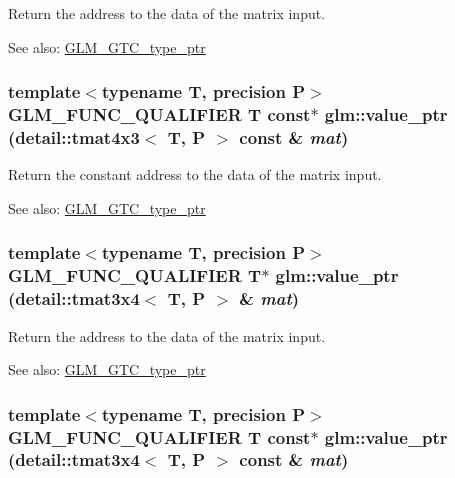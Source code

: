 Return the address to the data of the matrix input. \begin{Desc}
\item[See also:]\hyperlink{group__gtc__type__ptr}{GLM\_\-GTC\_\-type\_\-ptr} \end{Desc}
\hypertarget{group__gtc__type__ptr_g7c8877c9dc37f2229d4b75fd735be5d5}{
\subsubsection[value\_\-ptr]{\setlength{\rightskip}{0pt plus 5cm}template$<$typename T, precision P$>$ GLM\_\-FUNC\_\-QUALIFIER T const$\ast$ glm::value\_\-ptr (detail::tmat4x3$<$ T, P $>$ const \& {\em mat})}}
\label{group__gtc__type__ptr_g7c8877c9dc37f2229d4b75fd735be5d5}


Return the constant address to the data of the matrix input. \begin{Desc}
\item[See also:]\hyperlink{group__gtc__type__ptr}{GLM\_\-GTC\_\-type\_\-ptr} \end{Desc}
\hypertarget{group__gtc__type__ptr_gf7f8f1087650774da27f31c99175cfeb}{
\subsubsection[value\_\-ptr]{\setlength{\rightskip}{0pt plus 5cm}template$<$typename T, precision P$>$ GLM\_\-FUNC\_\-QUALIFIER T$\ast$ glm::value\_\-ptr (detail::tmat3x4$<$ T, P $>$ \& {\em mat})}}
\label{group__gtc__type__ptr_gf7f8f1087650774da27f31c99175cfeb}


Return the address to the data of the matrix input. \begin{Desc}
\item[See also:]\hyperlink{group__gtc__type__ptr}{GLM\_\-GTC\_\-type\_\-ptr} \end{Desc}
\hypertarget{group__gtc__type__ptr_g7ac16d67cf7bb44cb53bc7e6a7c8bd2c}{
\subsubsection[value\_\-ptr]{\setlength{\rightskip}{0pt plus 5cm}template$<$typename T, precision P$>$ GLM\_\-FUNC\_\-QUALIFIER T const$\ast$ glm::value\_\-ptr (detail::tmat3x4$<$ T, P $>$ const \& {\em mat})}}
\label{group__gtc__type__ptr_g7ac16d67cf7bb44cb53bc7e6a7c8bd2c}


